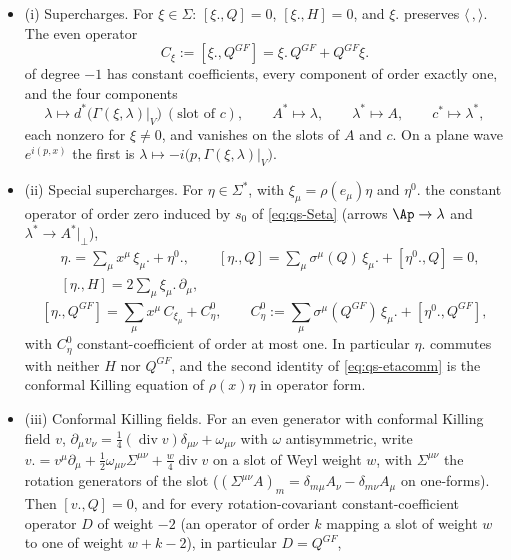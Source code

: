 \begin{proposition}
\label{prop:qs-comm}
\begin{itemize}
\item (i) Supercharges. For $\xi\in\Sigma$: $[\xi.,Q]=0$, $[\xi.,H]=0$, and $\xi.$ preserves $\langle\,,\rangle$. The even operator
\begin{equation}
C_\xi:=[\xi.,Q^{GF}]=\xi.\,Q^{GF}+Q^{GF}\xi.
\label{eq:qs-Cxi}
\end{equation}
of degree $-1$ has constant coefficients, every component of order exactly one, and the four components
\[
\lambda\mapsto d^*\big(\Gamma(\xi,\lambda)|_V\big)\ (\text{slot of }c),\qquad A^*\mapsto\lambda,\qquad \lambda^*\mapsto A,\qquad c^*\mapsto\lambda^*,
\]
each nonzero for $\xi\neq0$, and vanishes on the slots of $A$ and $c$. On a plane wave $e^{i(p,x)}$ the first is $\lambda\mapsto-i\big(p,\Gamma(\xi,\lambda)|_V\big)$.
\item (ii) Special supercharges. For $\eta\in\Sigma^*$, with $\xi_\mu=\rho(e_\mu)\eta$ and $\eta^0.$ the constant operator of order zero induced by $s_0$ of \eqref{eq:qs-Seta} (arrows $\Ap\to\lambda$ and $\lambda^*\to A^*|_\perp$),
\begin{equation}
\begin{aligned}
&\eta.=\sum_\mu x^\mu\,\xi_\mu.+\eta^0.,\qquad [\eta.,Q]=\sum_\mu\sigma^\mu(Q)\,\xi_\mu.+[\eta^0.,Q]=0,\\
&[\eta.,H]=2\sum_\mu\xi_\mu.\,\partial_\mu,
\end{aligned}
\label{eq:qs-etacomm}
\end{equation}
\[
[\eta.,Q^{GF}]=\sum_\mu x^\mu\,C_{\xi_\mu}+C^0_\eta,\qquad C^0_\eta:=\sum_\mu\sigma^\mu(Q^{GF})\,\xi_\mu.+[\eta^0.,Q^{GF}],
\]
with $C^0_\eta$ constant-coefficient of order at most one. In particular $\eta.$ commutes with neither $H$ nor $Q^{GF}$, and the second identity of \eqref{eq:qs-etacomm} is the conformal Killing equation of $\rho(x)\eta$ in operator form.
\item (iii) Conformal Killing fields. For an even generator with conformal Killing field $v$, $\partial_\mu v_\nu=\tfrac14(\operatorname{div}v)\delta_{\mu\nu}+\omega_{\mu\nu}$ with $\omega$ antisymmetric, write $v.=v^\mu\partial_\mu+\tfrac12\omega_{\mu\nu}\Sigma^{\mu\nu}+\tfrac w4\operatorname{div}v$ on a slot of Weyl weight $w$, with $\Sigma^{\mu\nu}$ the rotation generators of the slot ($(\Sigma^{\mu\nu}A)_m=\delta_{m\mu}A_\nu-\delta_{m\nu}A_\mu$ on one-forms). Then $[v.,Q]=0$, and for every rotation-covariant constant-coefficient operator $D$ of weight $-2$ (an operator of order $k$ mapping a slot of weight $w$ to one of weight $w+k-2$), in particular $D=Q^{GF}$,

\end{itemize}
\end{proposition}
